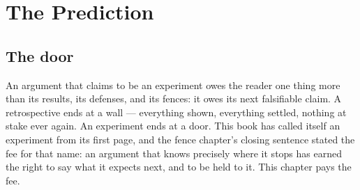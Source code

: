 \chapter{The Prediction}

\section{The door}

An argument that claims to be an experiment owes the reader one thing more than its
results, its defenses, and its fences: it owes its next falsifiable claim. A
retrospective ends at a wall --- everything shown, everything settled, nothing at
stake ever again. An experiment ends at a door. This book has called itself an
experiment from its first page, and the fence chapter's closing sentence stated the
fee for that name: an argument that knows precisely where it stops has earned the
right to say what it expects next, and to be held to it. This chapter pays the fee.

